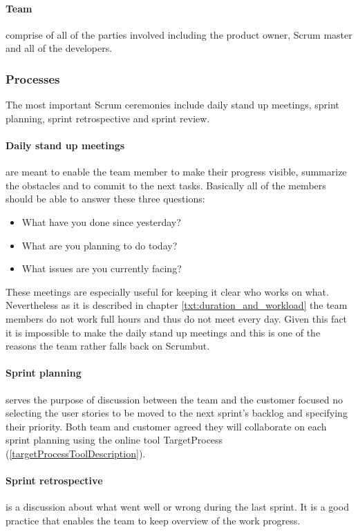 \paragraph{Team} comprise of all of the parties involved including the product owner, Scrum master and all of the developers.

\subsubsection{Processes}
The most important Scrum ceremonies include daily stand up meetings, sprint planning, sprint retrospective and sprint review.

\paragraph{Daily stand up meetings} are meant to enable the team member to make their progress visible, summarize the obstacles and to commit to the next tasks. Basically all of the members should be able to answer these three questions:

\begin{itemize}
\item What have you done since yesterday?
\item What are you planning to do today?
\item What issues are you currently facing?
\end{itemize}

These meetings are especially useful for keeping it clear who works on what. Nevertheless as it is described in chapter \ref{txt:duration_and_workload} the team members do not work full hours and thus do not meet every day. Given this fact it is impossible to make the daily stand up meetings and this is one of the reasons the team rather falls back on Scrumbut.

\paragraph{Sprint planning} serves the purpose of discussion between the team and the customer focused no selecting the user stories to be moved to the next sprint's backlog and specifying their priority. Both team and customer agreed they will collaborate on each sprint planning using the online tool TargetProcess (\ref{targetProcessToolDescription}).

\paragraph{Sprint retrospective} is a discussion about what went well or wrong during the last sprint. It is a good practice that enables the team to keep overview of the work progress.

